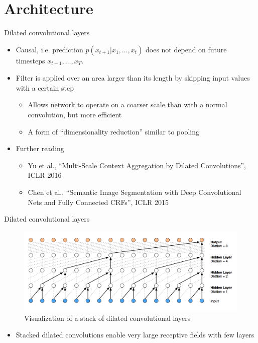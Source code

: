 \documentclass{beamer}
\begin{document}
  \section{Architecture}
  \begin{frame}{Dilated convolutional layers}
    \begin{itemize}
      \item Causal, i.e. prediction $p(x_{t+1} | x_1, \dots, x_t)$ does not depend on future timesteps $x_{t+1}, \dots, x_T$.
      \item Filter is applied over an area larger than its length by skipping input values with a certain step
            \begin{itemize}
              \item Allows network to operate on a coarser scale than with a normal convolution, but more efficient
              \item A form of ``dimensionality reduction'' similar to pooling
            \end{itemize}
          \item Further reading 
            \begin{itemize}
            \item  Yu et al., ``Multi-Scale Context Aggregation by Dilated Convolutions'', ICLR 2016
            \item Chen et al., ``Semantic Image Segmentation with Deep Convolutional Nets and Fully Connected CRFs'', ICLR 2015
            \end{itemize}
    \end{itemize}
  \end{frame}

  \begin{frame}{Dilated convolutional layers}
    \begin{figure}
      \includegraphics[width=\textwidth]{img/dilated_conv.png}
      \caption{Visualization of a stack of dilated convolutional layers}
    \end{figure}
    \begin{itemize}
    \item Stacked dilated convolutions enable very large receptive fields with few layers
    \end{itemize}
  \end{frame}
\end{document}
